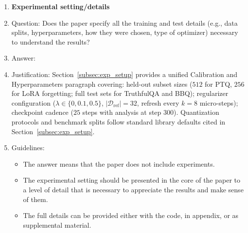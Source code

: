 \begin{enumerate}
\item {\bf Experimental setting/details}
    \item[] Question: Does the paper specify all the training and test details (e.g., data splits, hyperparameters, how they were chosen, type of optimizer) necessary to understand the results?
    \item[] Answer: \answerYes{}
    \item[] Justification: Section~\ref{subsec:exp_setup} provides a unified Calibration and Hyperparameters paragraph covering: held-out subset sizes ($512$ for PTQ, $256$ for LoRA forgetting; full test sets for TruthfulQA and BBQ); regularizer configuration ($\lambda \in \{0, 0.1, 0.5\}$, $|\mathcal{D}_{\mathrm{ref}}|=32$, refresh every $k=8$ micro-steps); checkpoint cadence ($25$ steps with analysis at step $300$). Quantization protocols and benchmark splits follow standard library defaults cited in Section~\ref{subsec:exp_setup}.
    \item[] Guidelines:
    \begin{itemize}
        \item The answer \answerNA{} means that the paper does not include experiments.
        \item The experimental setting should be presented in the core of the paper to a level of detail that is necessary to appreciate the results and make sense of them.
        \item The full details can be provided either with the code, in appendix, or as supplemental material.
    \end{itemize}


\end{enumerate}
